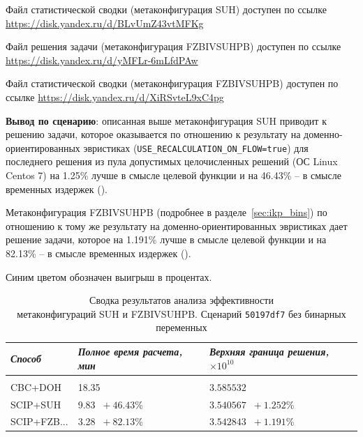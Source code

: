 \documentclass[%
	11pt,
	a4paper,
	utf8,
		]{article}
\begin{document}
Файл статистической сводки (метаконфигурация SUH) доступен по ссылке \url{https://disk.yandex.ru/d/BLvUmZ43vtMFKg}

Файл решения задачи (метаконфигурация FZBIVSUHPB) доступен по ссылке \url{https://disk.yandex.ru/d/yMFLr-6mLfdPAw}

Файл статистической сводки (метаконфигурация FZBIVSUHPB) доступен по ссылке \url{https://disk.yandex.ru/d/XiRSvteL9xC4pg}

\vspace*{3mm}
\textbf{Вывод по сценарию}: описанная выше метаконфигурация SUH приводит к решению задачи, которое оказывается по отношению к результату на доменно-ориентированных эвристиках (\verb|USE_RECALCULATION_ON_FLOW=true|) для последнего решения из пула допустимых целочисленных решений (ОС Linux Centos 7) на 1.25\% лучше в смысле целевой функции и на 46.43\% -- в смысле временных издержек (). 

Метаконфигурация FZBIVSUHPB (подробнее в разделе~\ref{sec:ikp_bins}) по отношению к тому же результату на доменно-ориентированных эвристиках дает решение задачи, которое на 1.191\% лучше в смысле целевой функции и на 82.13\% -- в смысле временных издержек ().

Синим цветом обозначен выигрыш в процентах.

{
	\begin{table}[!h]
		\centering
		\caption{Сводка результатов анализа эффективности \\метаконфигураций SUH и FZBIVSUHPB. Сценарий \texttt{50197df7} без бинарных переменных}
		\begin{tabular}{ p{2.5cm} p{3.3cm} p{3.4cm} }
			\emph{Способ} & \emph{Полное время расчета, мин} & \emph{Верхняя граница решения, $ \times 10^{10} $} \\
			\hline\hline\\[-3.5mm]
			{CBC+DOH} & 18.35 & $ 3.585532 $ \\
			\hline
			SCIP+SUH & 9.83 {\color{blue} $\ +46.43 $\%} & $ 3.540567 $ {\color{blue} $\ +1.252 $\%} \\
			\hline
			SCIP+FZB... & 3.28 {\color{blue} $\ +82.13 $\%} & $ 3.542843 $ {\color{blue} $\ +1.191 $\%} \\
		\end{tabular}\label{tab:50197df7_wo_bins}
	\end{table}
}
\end{document}
